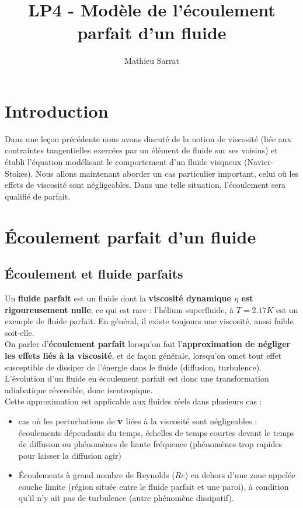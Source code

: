 \documentclass[11pt,a4paper]{report}
\author{Mathieu Sarrat}
\title{LP4 - Modèle de l'écoulement parfait d'un fluide}
\begin{document}
\maketitle

\section{Introduction}

Dans une leçon précédente nous avons discuté de la notion de viscosité (liée aux contraintes tangentielles exercées par un élément de fluide sur ses voisins) et établi l'équation modélisant le comportement d'un fluide visqueux (Navier-Stokes). Nous allons maintenant aborder un cas particulier important, celui où les effets de viscosité sont négligeables. Dans une telle situation, l'écoulement sera qualifié de parfait. 

\section{\'Ecoulement parfait d'un fluide}

\subsection{\'Ecoulement et fluide parfaits}

Un \textbf{fluide parfait} est un fluide dont la \textbf{viscosité dynamique $\eta $ est rigoureusement nulle}, ce qui est rare : l'hélium superfluide, à $T = 2.17 K$ est un exemple de fluide parfait. En général, il existe toujours une viscosité, aussi faible soit-elle.\\

On parler d'\textbf{écoulement parfait} lorsqu'on fait l'\textbf{approximation de négliger les effets liés à la viscosité}, et de façon générale, lorsqu'on omet tout effet susceptible de dissiper de l'énergie dans le fluide (diffusion, turbulence). L'évolution d'un fluide en écoulement parfait est donc une transformation adiabatique réversible, donc isentropique.\\

Cette approximation est applicable aux fluides réels dans plusieurs cas :
\begin{itemize}
	\item cas où les perturbations de $\bold{v}$ liées à la viscosité sont négligeables : écoulements dépendants du temps, échelles de temps courtes devant le temps de diffusion ou phénomènes de haute fréquence (phénomènes trop rapides pour laisser la diffusion agir)
	\item \'Ecoulements à grand nombre de Reynolds ($Re$) en dehors d'une zone appelée couche limite (région située entre le fluide parfait et une paroi), à condition qu'il n'y ait pas de turbulence (autre phénomène dissipatif).
\end{itemize}
\end{document}
